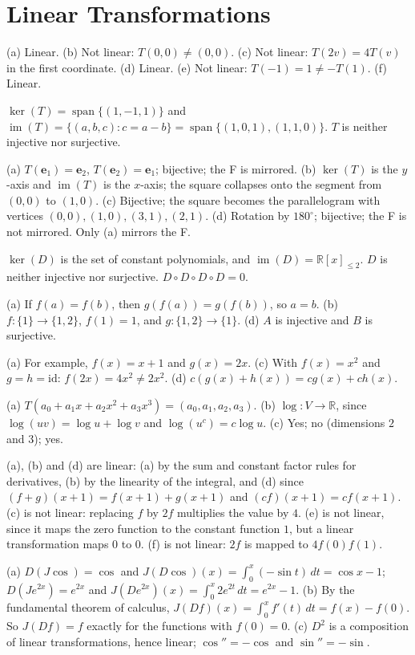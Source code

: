 \documentclass[11pt]{article}
\DeclareMathOperator{\im}{im}
\DeclareMathOperator{\Span}{span}
\begin{document}
\section*{Linear Transformations}

\begin{description}[leftmargin=0pt, itemsep=0.3em]
    \item[\ref{pr:linear}.] (a) Linear. (b) Not linear: $T(0, 0) \neq (0, 0)$. (c) Not linear: $T(2v) = 4T(v)$ in the first coordinate. (d) Linear. (e) Not linear: $T(-1) = 1 \neq -T(1)$. (f) Linear.
    \item[\ref{pr:kerim}.] $\ker(T) = \Span\{(1, -1, 1)\}$ and $\im(T) = \{(a, b, c) : c = a - b\} = \Span\{(1, 0, 1), (1, 1, 0)\}$. $T$ is neither injective nor surjective.
    \item[\ref{pr:gallery}.] (a) $T(\mathbf{e}_1) = \mathbf{e}_2$, $T(\mathbf{e}_2) = \mathbf{e}_1$; bijective; the F is mirrored. (b) $\ker(T)$ is the $y$-axis and $\im(T)$ is the $x$-axis; the square collapses onto the segment from $(0, 0)$ to $(1, 0)$. (c) Bijective; the square becomes the parallelogram with vertices $(0, 0), (1, 0), (3, 1), (2, 1)$. (d) Rotation by $180^\circ$; bijective; the F is not mirrored. Only (a) mirrors the F.
    \item[\ref{pr:derivative}.] $\ker(D)$ is the set of constant polynomials, and $\im(D) = \mathbb{R}[x]_{\leq 2}$. $D$ is neither injective nor surjective. $D \circ D \circ D \circ D = 0$.
    \item[\ref{pr:composition}.] (a) If $f(a) = f(b)$, then $g(f(a)) = g(f(b))$, so $a = b$. (b) $f: \{1\} \to \{1, 2\}$, $f(1) = 1$, and $g: \{1, 2\} \to \{1\}$. (d) $A$ is injective and $B$ is surjective.
    \item[\ref{pr:distributive}.] (a) For example, $f(x) = x + 1$ and $g(x) = 2x$. (c) With $f(x) = x^2$ and $g = h = \mathrm{id}$: $f(2x) = 4x^2 \neq 2x^2$. (d) $c(g(x) + h(x)) = cg(x) + ch(x)$.
    \item[\ref{pr:iso}.] (a) $T(a_0 + a_1 x + a_2 x^2 + a_3 x^3) = (a_0, a_1, a_2, a_3)$. (b) $\log: V \to \mathbb{R}$, since $\log(uv) = \log u + \log v$ and $\log(u^c) = c\log u$. (c) Yes; no (dimensions $2$ and $3$); yes.
    \item[\ref{pr:calculus-maps}.] (a), (b) and (d) are linear: (a) by the sum and constant factor rules for derivatives, (b) by the linearity of the integral, and (d) since $(f + g)(x + 1) = f(x + 1) + g(x + 1)$ and $(cf)(x + 1) = c f(x + 1)$. (c) is not linear: replacing $f$ by $2f$ multiplies the value by $4$. (e) is not linear, since it maps the zero function to the constant function $1$, but a linear transformation maps $0$ to $0$. (f) is not linear: $2f$ is mapped to $4f(0)f(1)$.
    \item[\ref{pr:diff-int}.] (a) $D(J\cos) = \cos$ and $J(D\cos)(x) = \int_0^x (-\sin t)\, dt = \cos x - 1$; $D(Je^{2x}) = e^{2x}$ and $J(De^{2x})(x) = \int_0^x 2e^{2t}\, dt = e^{2x} - 1$. (b) By the fundamental theorem of calculus, $J(Df)(x) = \int_0^x f'(t)\, dt = f(x) - f(0)$. So $J(Df) = f$ exactly for the functions with $f(0) = 0$. (c) $D^2$ is a composition of linear transformations, hence linear; $\cos'' = -\cos$ and $\sin'' = -\sin$.
\end{description}
\end{document}
